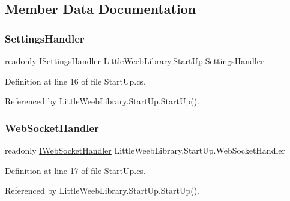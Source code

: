 \subsection{Member Data Documentation}
\mbox{\label{class_little_weeb_library_1_1_start_up_a42ceac2446a2d7593923c9f1b67d9f34}} 
\subsubsection{\texorpdfstring{Settings\+Handler}{SettingsHandler}}
{\footnotesize\ttfamily readonly \mbox{\hyperlink{interface_little_weeb_library_1_1_handlers_1_1_i_settings_handler}{I\+Settings\+Handler}} Little\+Weeb\+Library.\+Start\+Up.\+Settings\+Handler\hspace{0.3cm}{\ttfamily [private]}}



Definition at line 16 of file Start\+Up.\+cs.



Referenced by Little\+Weeb\+Library.\+Start\+Up.\+Start\+Up().

\mbox{\label{class_little_weeb_library_1_1_start_up_a2da461ac41945c5a63d4561a513dcaef}} 
\subsubsection{\texorpdfstring{Web\+Socket\+Handler}{WebSocketHandler}}
{\footnotesize\ttfamily readonly \mbox{\hyperlink{interface_little_weeb_library_1_1_handlers_1_1_i_web_socket_handler}{I\+Web\+Socket\+Handler}} Little\+Weeb\+Library.\+Start\+Up.\+Web\+Socket\+Handler\hspace{0.3cm}{\ttfamily [private]}}



Definition at line 17 of file Start\+Up.\+cs.



Referenced by Little\+Weeb\+Library.\+Start\+Up.\+Start\+Up().


